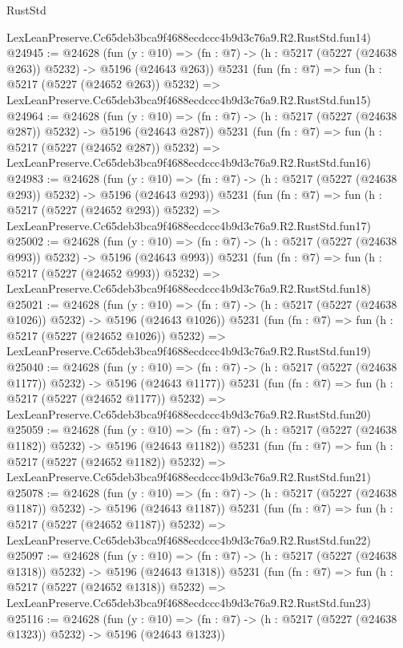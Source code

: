 \begin{lexlean}{RustStd}
\begin{coremodule}
    LexLeanPreserve.Cc65deb3bca9f4688ecdccc4b9d3c76a9.R2.RustStd.fun14)
@24945 := @24628
    (fun (y : @10) => (fn : @7) -> (h : @5217 (@5227 (@24638 @263)) @5232) -> @5196 (@24643 @263))
    @5231
    (fun (fn : @7) =>
    fun (h : @5217 (@5227 (@24652 @263)) @5232) =>
    LexLeanPreserve.Cc65deb3bca9f4688ecdccc4b9d3c76a9.R2.RustStd.fun15)
@24964 := @24628
    (fun (y : @10) => (fn : @7) -> (h : @5217 (@5227 (@24638 @287)) @5232) -> @5196 (@24643 @287))
    @5231
    (fun (fn : @7) =>
    fun (h : @5217 (@5227 (@24652 @287)) @5232) =>
    LexLeanPreserve.Cc65deb3bca9f4688ecdccc4b9d3c76a9.R2.RustStd.fun16)
@24983 := @24628
    (fun (y : @10) => (fn : @7) -> (h : @5217 (@5227 (@24638 @293)) @5232) -> @5196 (@24643 @293))
    @5231
    (fun (fn : @7) =>
    fun (h : @5217 (@5227 (@24652 @293)) @5232) =>
    LexLeanPreserve.Cc65deb3bca9f4688ecdccc4b9d3c76a9.R2.RustStd.fun17)
@25002 := @24628
    (fun (y : @10) => (fn : @7) -> (h : @5217 (@5227 (@24638 @993)) @5232) -> @5196 (@24643 @993))
    @5231
    (fun (fn : @7) =>
    fun (h : @5217 (@5227 (@24652 @993)) @5232) =>
    LexLeanPreserve.Cc65deb3bca9f4688ecdccc4b9d3c76a9.R2.RustStd.fun18)
@25021 := @24628
    (fun (y : @10) => (fn : @7) -> (h : @5217 (@5227 (@24638 @1026)) @5232) -> @5196 (@24643 @1026))
    @5231
    (fun (fn : @7) =>
    fun (h : @5217 (@5227 (@24652 @1026)) @5232) =>
    LexLeanPreserve.Cc65deb3bca9f4688ecdccc4b9d3c76a9.R2.RustStd.fun19)
@25040 := @24628
    (fun (y : @10) => (fn : @7) -> (h : @5217 (@5227 (@24638 @1177)) @5232) -> @5196 (@24643 @1177))
    @5231
    (fun (fn : @7) =>
    fun (h : @5217 (@5227 (@24652 @1177)) @5232) =>
    LexLeanPreserve.Cc65deb3bca9f4688ecdccc4b9d3c76a9.R2.RustStd.fun20)
@25059 := @24628
    (fun (y : @10) => (fn : @7) -> (h : @5217 (@5227 (@24638 @1182)) @5232) -> @5196 (@24643 @1182))
    @5231
    (fun (fn : @7) =>
    fun (h : @5217 (@5227 (@24652 @1182)) @5232) =>
    LexLeanPreserve.Cc65deb3bca9f4688ecdccc4b9d3c76a9.R2.RustStd.fun21)
@25078 := @24628
    (fun (y : @10) => (fn : @7) -> (h : @5217 (@5227 (@24638 @1187)) @5232) -> @5196 (@24643 @1187))
    @5231
    (fun (fn : @7) =>
    fun (h : @5217 (@5227 (@24652 @1187)) @5232) =>
    LexLeanPreserve.Cc65deb3bca9f4688ecdccc4b9d3c76a9.R2.RustStd.fun22)
@25097 := @24628
    (fun (y : @10) => (fn : @7) -> (h : @5217 (@5227 (@24638 @1318)) @5232) -> @5196 (@24643 @1318))
    @5231
    (fun (fn : @7) =>
    fun (h : @5217 (@5227 (@24652 @1318)) @5232) =>
    LexLeanPreserve.Cc65deb3bca9f4688ecdccc4b9d3c76a9.R2.RustStd.fun23)
@25116 := @24628
    (fun (y : @10) => (fn : @7) -> (h : @5217 (@5227 (@24638 @1323)) @5232) -> @5196 (@24643 @1323))

\end{coremodule}
\end{lexlean}
